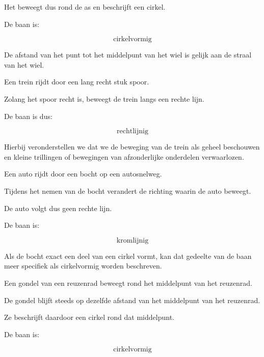 \documentclass{ximera}
\begin{document}
\begin{oefening}{\oefB}
\begin{question}
\begin{oplossing}
  Het beweegt dus rond de as en beschrijft een cirkel.
  
  De baan is:
  
  \[
  \boxed{\text{cirkelvormig}}
  \]
  
  De afstand van het punt tot het middelpunt van het wiel is gelijk aan de
  straal van het wiel.
  \end{oplossing}
  \end{question}
  
  
  \begin{question}
  Een trein rijdt door een lang recht stuk spoor.
  
  \begin{oplossing}
  Zolang het spoor recht is, beweegt de trein langs een rechte lijn.
  
  De baan is dus:
  
  \[
  \boxed{\text{rechtlijnig}}
  \]
  
  Hierbij veronderstellen we dat we de beweging van de trein als geheel
  beschouwen en kleine trillingen of bewegingen van afzonderlijke onderdelen
  verwaarlozen.
  \end{oplossing}
  \end{question}
  
  
  \begin{question}
  Een auto rijdt door een bocht op een autosnelweg.
  
  \begin{oplossing}
  Tijdens het nemen van de bocht verandert de richting waarin de auto beweegt.
  
  De auto volgt dus geen rechte lijn.
  
  De baan is:
  
  \[
  \boxed{\text{kromlijnig}}
  \]
  
  Als de bocht exact een deel van een cirkel vormt, kan dat gedeelte van de baan
  meer specifiek als cirkelvormig worden beschreven.
  \end{oplossing}
  \end{question}
  
  
  \begin{question}
  Een gondel van een reuzenrad beweegt rond het middelpunt van het reuzenrad.
  
  \begin{oplossing}
  De gondel blijft steeds op dezelfde afstand van het middelpunt van het
  reuzenrad.
  
  Ze beschrijft daardoor een cirkel rond dat middelpunt.
  
  De baan is:
  
  \[
  \boxed{\text{cirkelvormig}}
  \]
  \end{oplossing}
  \end{question}
  
  \end{oefening}
\end{document}
